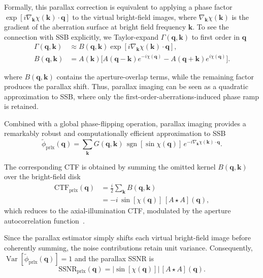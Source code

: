 \documentclass[pdflatex,sn-aps,iicol]{sn-jnl}%
\begin{document}
Formally, this parallax correction is equivalent to applying a phase factor $\exp[i \nabla_{\boldsymbol{k}} \chi(\boldsymbol{k}) \cdot \boldsymbol{q}]$ to the virtual bright-field images, where $\nabla_{\boldsymbol{k}} \chi(\boldsymbol{k})$ is the gradient of the aberration surface at bright field frequency $\boldsymbol{k}$.
To see the connection with SSB explicitly, we Taylor-expand $\Gamma(\boldsymbol{q},\boldsymbol{k})$ to first order in $\boldsymbol{q}$
\begin{align}
\Gamma(\boldsymbol{q},\boldsymbol{k})
&\approx
B(\boldsymbol{q},\boldsymbol{k})
\exp\!\left[i\nabla_{\boldsymbol{k}}\chi(\boldsymbol{k})\cdot\boldsymbol{q}\right],
\\
B(\boldsymbol{q},\boldsymbol{k})
&=
A(\boldsymbol{k})
\Big[
A(\boldsymbol{q}-\boldsymbol{k})e^{-i\chi(\boldsymbol{q})}
-
A(\boldsymbol{q}+\boldsymbol{k})e^{i\chi(\boldsymbol{q})}
\Big].
\label{eq:prlx-gamma-approx}
\end{align}

where $B(\boldsymbol{q},\boldsymbol{k})$ contains the aperture-overlap terms, while the remaining factor produces the parallax shift.
Thus, parallax imaging can be seen as a quadratic approximation to SSB, where only the first-order-aberrations-induced phase ramp is retained.

Combined with a global phase-flipping operation, parallax imaging provides a remarkably robust and computationally efficient approximation to SSB~\cite{Varnavides_2025}
\begin{equation}
\tilde{\phi}_{\text{prlx}}(\boldsymbol{q})
=
\sum_{\boldsymbol{k}}
G(\boldsymbol{q},\boldsymbol{k})
\,\operatorname{sgn}[\sin\chi(\boldsymbol{q})]\,
e^{-i\nabla_{\boldsymbol{k}}\chi(\boldsymbol{k})\cdot\boldsymbol{q}} .
\label{eq:par-recon}
\end{equation}

The corresponding CTF is obtained by summing the omitted kernel $B(\boldsymbol{q},\boldsymbol{k})$ over the bright-field disk
\begin{align}
\mathrm{CTF}_{\text{prlx}}(\boldsymbol{q})
&=
\frac{i}{2}\sum_{\boldsymbol{k}}B(\boldsymbol{q},\boldsymbol{k})
\nonumber\\
&=
-i\,\sin[\chi(\boldsymbol{q})]\,[A\star A](\boldsymbol{q}),
\label{eq:prlx-ctf}
\end{align}
which reduces to the axial-illumination CTF, modulated by the aperture autocorrelation function~\cite{Yu_2022,Varnavides_2024,Varnavides_2025}.

Since the parallax estimator simply shifts each virtual bright-field image before coherently summing, the noise contributions retain unit variance.
Consequently, $\operatorname{Var}\!\left[\tilde{\phi}_{\text{prlx}}(\boldsymbol{q})\right]=1$ and the parallax SSNR is
\begin{equation}
\mathrm{SSNR}_{\text{prlx}}(\boldsymbol{q})
=
\lvert \sin[\chi(\boldsymbol{q})] \rvert\,[A\star A](\boldsymbol{q}).
\label{eq:prlx-ssnr}
\end{equation}
\end{document}
